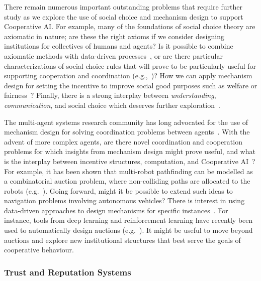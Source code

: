 \documentclass[11pt, a4paper, logo, onecolumn, nonumbering]{deepmind}
\begin{document}
There remain numerous important outstanding problems that require further study as we explore the use of social choice and mechanism design to support Cooperative AI. For example, many of the foundations of social choice theory are axiomatic in nature; are these the right axioms if we consider designing institutions for collectives of humans and agents? Is it possible to combine axiomatic methods with data-driven processes~\cite{deon2020testing,armstrong2019machine}, or are there particular characterizations of social choice rules that will prove to be particularly useful for supporting cooperation and coordination (e.g.,~\cite{jiang2014diverse,caragiannis2013noisy})? How we can apply mechanism design for setting the incentive to improve social good purposes such as welfare or fairness~\cite{abebe2018mechanism}?
Finally, there is a strong interplay between \emph{understanding}, \emph{communication}, and social choice which deserves further exploration~\cite{boutilierincomplete}.

The multi-agent systems research community has long advocated for the use of mechanism design for solving coordination problems between agents~\cite{rosenschein1994rules}. With the advent of more complex agents, are there novel coordination and cooperation problems for which insights from mechanism design might prove useful, and what is the interplay between incentive structures, computation, and Cooperative AI~\cite{nisan2001algorithmic,nisan2007computationally}? For example, it has been shown that multi-robot pathfinding can be modelled as a combinatorial auction problem, where non-colliding paths are allocated to the robots (e.g.~\cite{amir2015multi}). Going forward, might it be possible to extend such ideas to navigation problems involving autonomous vehicles? There is interest in using data-driven approaches to design mechanisms for specific instances~\cite{conitzer2002complexity,sandholm2003automated}. For instance, tools from deep learning and reinforcement learning have recently been used to automatically design auctions  (e.g.~\cite{duttingFJLLP12,duetting0NPR19,tacchetti2019neural,tang2017reinforcement}). It might be useful to move beyond auctions and explore new institutional structures that best serve the goals of cooperative behaviour. 

\subsubsection{Trust and Reputation Systems}
\end{document}

